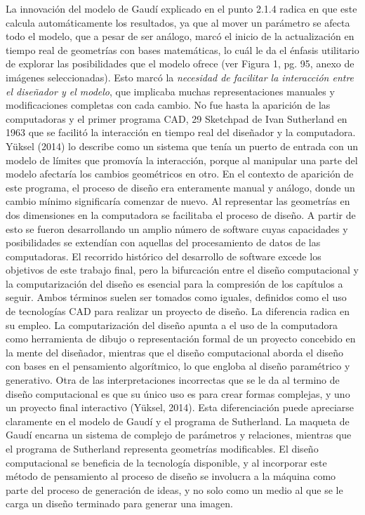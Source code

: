 La innovación del modelo de Gaudí explicado en el punto 2.1.4 radica en que este calcula automáticamente los resultados, ya que al mover un parámetro se afecta todo el modelo, que a pesar de ser análogo, marcó el inicio de la actualización en tiempo real de geometrías con bases matemáticas, lo cuál le da el énfasis utilitario de explorar las
posibilidades que el modelo ofrece (ver Figura 1, pg. 95, anexo de imágenes seleccionadas).
Esto marcó la \textit{necesidad de facilitar la interacción entre el diseñador y el modelo}, que implicaba muchas representaciones manuales y modificaciones completas con cada cambio. No fue hasta la aparición de las computadoras y el primer programa CAD, 29 Sketchpad de Ivan Sutherland en 1963 que se facilitó la interacción en tiempo real del diseñador y la computadora. Yüksel (2014) lo describe como un sistema que tenía un puerto de entrada con un modelo de límites que promovía la interacción, porque al manipular una parte del modelo afectaría los cambios geométricos en otro. En el contexto de aparición de este programa, el proceso de diseño era enteramente manual y análogo,
donde un cambio mínimo significaría comenzar de nuevo. Al representar las geometrías en dos dimensiones en la computadora se facilitaba el proceso de diseño. A partir de esto se fueron desarrollando un amplio número de software cuyas capacidades y posibilidades se extendían con aquellas del procesamiento de datos de las
computadoras.
El recorrido histórico del desarrollo de software excede los objetivos de este trabajo final, pero la bifurcación entre el diseño computacional y la computarización del diseño es esencial para la compresión de los capítulos a seguir. Ambos términos suelen ser tomados como iguales, definidos como el uso de tecnologías CAD para realizar un
proyecto de diseño. La diferencia radica en su empleo. La computarización del diseño apunta a el uso de la computadora como herramienta de dibujo o representación formal de un proyecto concebido en la mente del diseñador, mientras que el diseño computacional aborda el diseño con bases en el pensamiento algorítmico, lo que engloba al diseño paramétrico y generativo. Otra de las interpretaciones incorrectas que se le da
al termino de diseño computacional es que su único uso es para crear formas complejas, y uno un proyecto final interactivo (Yüksel, 2014). Esta diferenciación puede apreciarse claramente en el modelo de Gaudí y el programa de Sutherland. La maqueta de Gaudí encarna un sistema de complejo de parámetros y relaciones, mientras que el programa
de Sutherland representa geometrías modificables. El diseño computacional se beneficia de la tecnología disponible, y al incorporar este método de pensamiento al proceso de diseño se involucra a la máquina como parte del proceso de generación de ideas, y no solo como un medio al que se le carga un diseño terminado para generar una imagen.

